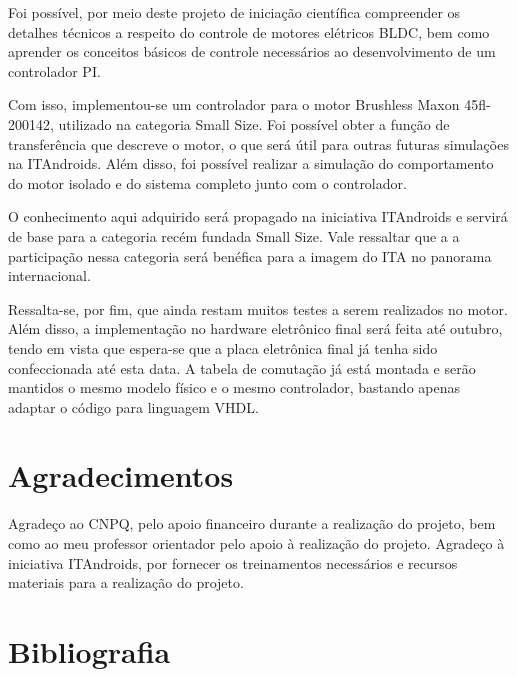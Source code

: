 \documentclass[a4paper,11pt]{article}
\begin{document}
	Foi possível, por meio deste projeto de iniciação científica compreender os detalhes técnicos a respeito do controle de motores elétricos BLDC, bem como aprender os conceitos básicos de controle necessários ao desenvolvimento de um controlador PI.
	
	Com isso, implementou-se um controlador para o motor Brushless Maxon 45fl-200142, utilizado na categoria Small Size. Foi possível obter a função de transferência que descreve o motor, o que será útil para outras futuras simulações na ITAndroids. Além disso, foi possível realizar a simulação do comportamento do motor isolado e do sistema completo junto com o controlador.
	
	O conhecimento aqui adquirido será propagado na iniciativa ITAndroids e servirá de base para a categoria recém fundada Small Size. Vale ressaltar que a a participação nessa categoria será benéfica para a imagem do ITA no panorama internacional.
	
	Ressalta-se, por fim, que ainda restam muitos testes a serem realizados no motor. Além disso, a implementação no hardware eletrônico final será feita até outubro, tendo em vista que espera-se que a placa eletrônica final já tenha sido confeccionada até esta data.  A tabela de comutação já está montada e serão mantidos o mesmo modelo físico e o mesmo controlador, bastando apenas adaptar o código para linguagem VHDL.
	
	\section{Agradecimentos}
	Agradeço ao CNPQ, pelo apoio financeiro durante a realização do projeto, bem como ao meu professor orientador pelo apoio à realização do projeto. Agradeço à iniciativa ITAndroids, por fornecer os treinamentos necessários e recursos materiais para a realização do projeto.
	
	\section{Bibliografia}
	\printbibliography[heading=none]
	
\end{document}

